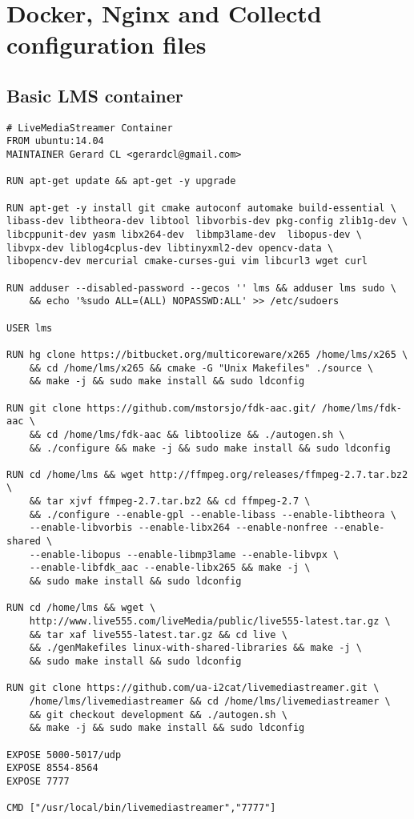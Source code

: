 \chapter{Docker, Nginx and Collectd configuration files}\label{ANX:dockerFiles}

\section{Basic LMS container}\label{ANX:dockerFiles1}

\begin{verbatim}
# LiveMediaStreamer Container
FROM ubuntu:14.04
MAINTAINER Gerard CL <gerardcl@gmail.com>

RUN apt-get update && apt-get -y upgrade

RUN apt-get -y install git cmake autoconf automake build-essential \ 
libass-dev libtheora-dev libtool libvorbis-dev pkg-config zlib1g-dev \
libcppunit-dev yasm libx264-dev  libmp3lame-dev  libopus-dev \
libvpx-dev liblog4cplus-dev libtinyxml2-dev opencv-data \
libopencv-dev mercurial cmake-curses-gui vim libcurl3 wget curl 

RUN adduser --disabled-password --gecos '' lms && adduser lms sudo \
	&& echo '%sudo ALL=(ALL) NOPASSWD:ALL' >> /etc/sudoers

USER lms

RUN hg clone https://bitbucket.org/multicoreware/x265 /home/lms/x265 \
	&& cd /home/lms/x265 && cmake -G "Unix Makefiles" ./source \
	&& make -j && sudo make install && sudo ldconfig

RUN git clone https://github.com/mstorsjo/fdk-aac.git/ /home/lms/fdk-aac \
	&& cd /home/lms/fdk-aac && libtoolize && ./autogen.sh \
	&& ./configure && make -j && sudo make install && sudo ldconfig

RUN cd /home/lms && wget http://ffmpeg.org/releases/ffmpeg-2.7.tar.bz2 \
	&& tar xjvf ffmpeg-2.7.tar.bz2 && cd ffmpeg-2.7 \
	&& ./configure --enable-gpl --enable-libass --enable-libtheora \
	--enable-libvorbis --enable-libx264 --enable-nonfree --enable-shared \
	--enable-libopus --enable-libmp3lame --enable-libvpx \
	--enable-libfdk_aac --enable-libx265 && make -j \
	&& sudo make install && sudo ldconfig

RUN cd /home/lms && wget \
	http://www.live555.com/liveMedia/public/live555-latest.tar.gz \
	&& tar xaf live555-latest.tar.gz && cd live \
	&& ./genMakefiles linux-with-shared-libraries && make -j \
	&& sudo make install && sudo ldconfig

RUN git clone https://github.com/ua-i2cat/livemediastreamer.git \
	/home/lms/livemediastreamer && cd /home/lms/livemediastreamer \
	&& git checkout development && ./autogen.sh \
	&& make -j && sudo make install && sudo ldconfig

EXPOSE 5000-5017/udp
EXPOSE 8554-8564
EXPOSE 7777

CMD ["/usr/local/bin/livemediastreamer","7777"] 
\end{verbatim}

